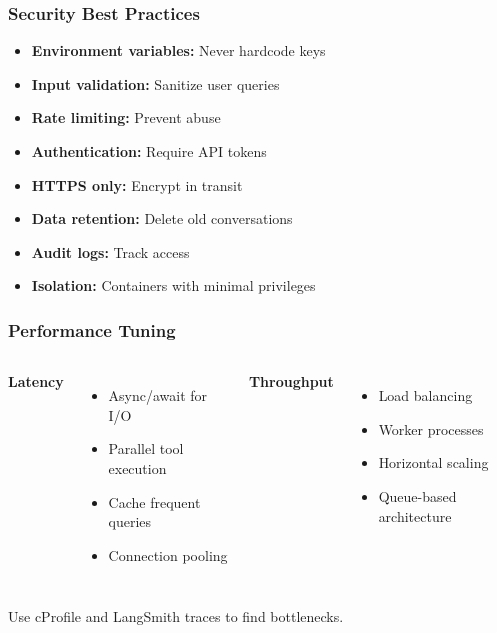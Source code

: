 \documentclass[aspectratio=169,11pt]{beamer}
\begin{document}
\begin{frame}
  \frametitle{Security Best Practices}

  \begin{itemize}
    \item \textbf{Environment variables:} Never hardcode keys
    \item \textbf{Input validation:} Sanitize user queries
    \item \textbf{Rate limiting:} Prevent abuse
    \item \textbf{Authentication:} Require API tokens
    \item \textbf{HTTPS only:} Encrypt in transit
    \item \textbf{Data retention:} Delete old conversations
    \item \textbf{Audit logs:} Track access
    \item \textbf{Isolation:} Containers with minimal privileges
  \end{itemize}
\end{frame}

\begin{frame}
  \frametitle{Performance Tuning}

  \begin{columns}[T]
    \textbf{Latency}
    \begin{itemize}
      \item Async/await for I/O
      \item Parallel tool execution
      \item Cache frequent queries
      \item Connection pooling
    \end{itemize}

    \textbf{Throughput}
    \begin{itemize}
      \item Load balancing
      \item Worker processes
      \item Horizontal scaling
      \item Queue-based architecture
    \end{itemize}
  \end{columns}

  \begin{tipbox}[Profiling]
    \small Use cProfile and LangSmith traces to find bottlenecks.
  \end{tipbox}
\end{frame}
\end{document}
